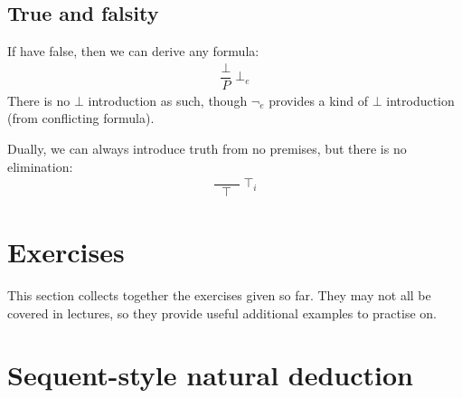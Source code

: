 \documentclass{article}
\theoremstyle{definition}
\begin{document}
\subsection{True and falsity}

If have false, then we can derive any formula:
%
\begin{align*}
\dfrac{\bot}{P} \; {\bot_e}
\end{align*}
%
There is no $\bot$ introduction as such, though $\neg_{e}$
provides a kind of $\bot$ introduction (from conflicting formula).

Dually, we can always introduce truth from no premises, but there
is no elimination:
%
\begin{align*}
\dfrac{\qquad}{\top} \; {\top_i}
\end{align*}
%

\section{Exercises}

  This section collects together the exercises given so far. They may
  not all be covered in lectures, so they provide useful
  additional examples to practise on.

  \assoc*
  \andReproof*
  \implProperty*
  \kcombinator*
  \biimplRules*
  \orassoc*
  \disproveEx*

\appendix

\section{Sequent-style natural deduction}
\label{app:sequent}
\end{document}

